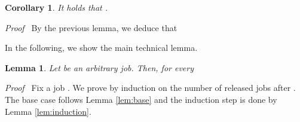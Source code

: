 \documentclass[11pt]{article}
\newenvironment{proof}{\noindent\emph{Proof\ }}{\hspace*{\fill}\medskip}
\newtheorem{lemma}{Lemma}
\newtheorem{corollary}{Corollary}
\begin{document}
\begin{corollary}		\label{cor:general-energy-lambda}
It holds that
.
\end{corollary}
\begin{proof}
By the previous lemma, we deduce that

\end{proof}

In the following, we show the main technical lemma.

\begin{lemma}		\label{lem:energy-general-main}
Let  be an arbitrary job.  
Then, for every 

\end{lemma} 
\begin{proof}
Fix a job . 
We prove by induction on the number of released jobs
after . The base case follows Lemma \ref{lem:base}
and the induction step is done by Lemma \ref{lem:induction}. 
\end{proof}
\end{document}
